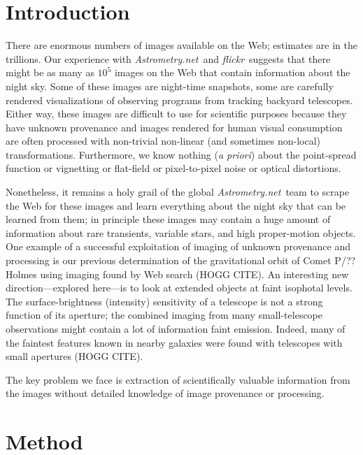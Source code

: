 \documentclass[12pt]{article}
\newcommand{\company}[1]{\textsl{#1}}
\newcommand{\An}{\company{Astrometry.net}}
\newcommand{\flickr}{\company{flickr}}
\newcommand{\foreign}[1]{\textit{#1}}
\begin{document}
\section{Introduction}

There are enormous numbers of images available on the Web; estimates
are in the trillions.  Our experience with \An\ and \flickr\ suggests
that there might be as many as $10^5$ images on the Web that contain
information about the night sky.  Some of these images are night-time
snapshots, some are carefully rendered visualizations of observing
programs from tracking backyard telescopes.  Either way, these images
are difficult to use for scientific purposes because they have unknown
provenance and images rendered for human visual consumption are often
processed with non-trivial non-linear (and sometimes non-local)
transformations.  Furthermore, we know nothing (\foreign{a priori})
about the point-spread function or vignetting or flat-field or
pixel-to-pixel noise or optical distortions.

Nonetheless, it remains a holy grail of the global \An\ team to scrape
the Web for these images and learn everything about the night sky that
can be learned from them; in principle these images may contain a huge
amount of information about rare transients, variable stars, and high
proper-motion objects.  One example of a successful exploitation of
imaging of unknown provenance and processing is our previous
determination of the gravitational orbit of Comet P/?? Holmes using
imaging found by Web search (HOGG CITE).  An interesting new
direction---explored here---is to look at extended objects at faint
isophotal levels.  The surface-brightness (intensity) sensitivity of a
telescope is not a strong function of its aperture; the combined
imaging from many small-telescope observations might contain a lot of
information faint emission.  Indeed, many of the faintest features
known in nearby galaxies were found with telescopes with small
apertures (HOGG CITE).

The key problem we face is extraction of scientifically valuable
information from the images without detailed knowledge of image
provenance or processing.

\section{Method}
\end{document}
